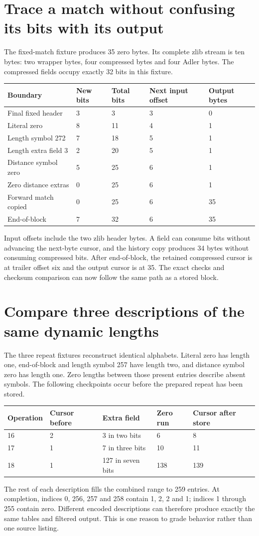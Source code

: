 \section{Trace a match without confusing its bits with its output}
The fixed-match fixture produces 35 zero bytes. Its complete zlib stream is ten bytes:
two wrapper bytes, four compressed bytes and four Adler bytes. The compressed fields
occupy exactly 32 bits in this fixture.

\begin{longtable}{p{40mm}p{22mm}p{26mm}p{29mm}p{27mm}}
\toprule Boundary & New bits & Total bits & Next input offset & Output bytes \\\midrule
Final fixed header & 3 & 3 & 3 & 0 \\
Literal zero & 8 & 11 & 4 & 1 \\
Length symbol 272 & 7 & 18 & 5 & 1 \\
Length extra field 3 & 2 & 20 & 5 & 1 \\
Distance symbol zero & 5 & 25 & 6 & 1 \\
Zero distance extras & 0 & 25 & 6 & 1 \\
Forward match copied & 0 & 25 & 6 & 35 \\
End-of-block & 7 & 32 & 6 & 35 \\\bottomrule
\end{longtable}
Input offsets include the two zlib header bytes. A field can consume bits without
advancing the next-byte cursor, and the history copy produces 34 bytes without consuming
compressed bits. After end-of-block, the retained compressed cursor is at trailer
offset six and the output cursor is at 35. The exact checks and checksum comparison
can now follow the same path as a stored block.

\section{Compare three descriptions of the same dynamic lengths}
The three repeat fixtures reconstruct identical alphabets. Literal zero has length
one, end-of-block and length symbol 257 have length two, and distance symbol zero has
length one. Zero lengths between those present entries describe absent symbols.
The following checkpoints occur before the prepared repeat has been stored.

\begin{longtable}{p{27mm}p{25mm}p{27mm}p{24mm}p{36mm}}
\toprule Operation & Cursor before & Extra field & Zero run & Cursor after store \\\midrule
16 & 2 & 3 in two bits & 6 & 8 \\
17 & 1 & 7 in three bits & 10 & 11 \\
18 & 1 & 127 in seven bits & 138 & 139 \\\bottomrule
\end{longtable}
The rest of each description fills the combined range to 259 entries. At completion,
indices 0, 256, 257 and 258 contain 1, 2, 2 and 1; indices 1 through 255 contain zero.
Different encoded descriptions can therefore produce exactly the same tables and
filtered output. This is one reason to grade behavior rather than one source listing.

